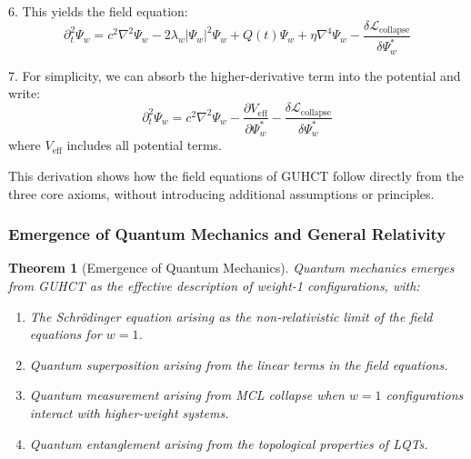 \documentclass[11pt,a4paper]{article}
\makeatletter
\newtheorem{theorem}{Theorem}[section]
\renewenvironment{proof}[1][\proofname]{\par
  \pushQED{\qed}%
  \normalfont \topsep6\p@\@plus6\p@\relax
  \trivlist
  \item[\hskip\labelsep
        \itshape
    #1\@addpunct{.}]\ignorespaces
}{%
  \popQED\endtrivlist\@endpefalse
}
\makeatother
\begin{document}
\begin{proof}
6. This yields the field equation:
   \begin{equation}
   \partial_t^2\Psi_w = c^2\nabla^2\Psi_w - 2\lambda_w|\Psi_w|^2\Psi_w + Q(t)\Psi_w + \eta\nabla^4\Psi_w - \frac{\delta \mathcal{L}_{\text{collapse}}}{\delta \Psi_w^*}
   \end{equation}

7. For simplicity, we can absorb the higher-derivative term into the potential and write:
   \begin{equation}
   \partial_t^2\Psi_w = c^2\nabla^2\Psi_w - \frac{\partial V_{\text{eff}}}{\partial \Psi_w^*} - \frac{\delta \mathcal{L}_{\text{collapse}}}{\delta \Psi_w^*}
   \end{equation}
   where $V_{\text{eff}}$ includes all potential terms.

This derivation shows how the field equations of GUHCT follow directly from the three core axioms, without introducing additional assumptions or principles.
\end{proof}

\subsubsection{Emergence of Quantum Mechanics and General Relativity}
\label{ssubsec:qm_gr_emergence_axioms} %

\begin{theorem}[Emergence of Quantum Mechanics]
\label{thm:qm_emergence_axioms_thm} %
Quantum mechanics emerges from GUHCT as the effective description of weight-1 configurations, with:
\begin{enumerate}
    \item The Schrödinger equation arising as the non-relativistic limit of the field equations for $w=1$.
    \item Quantum superposition arising from the linear terms in the field equations.
    \item Quantum measurement arising from MCL collapse when $w=1$ configurations interact with higher-weight systems.
    \item Quantum entanglement arising from the topological properties of LQTs.
\end{enumerate}
\end{theorem}
\end{document}
